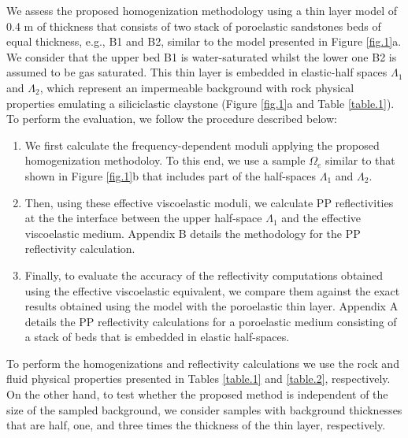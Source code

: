 \documentclass[draft]{agujournal2019}
\begin{document}
We assess the proposed homogenization methodology using a thin layer model of 0.4 m  of thickness that consists of two stack of poroelastic  sandstones beds of equal thickness, e.g., B1 and B2, similar to the model presented in Figure \ref{fig.1}a. We consider that the upper bed B1 is water-saturated whilst the lower one B2 is assumed to be gas saturated. This thin layer is embedded 
in elastic-half spaces $\Lambda_1$ and $\Lambda_2$, which represent an impermeable background  with rock physical properties emulating a siliciclastic claystone (Figure \ref{fig.1}a and Table \ref{table.1}). To perform the evaluation, we follow the procedure described below: 
\begin{enumerate}
    \item We first calculate the frequency-dependent moduli applying the proposed homogenization methodoloy. To this end, we use a sample $\Omega_e$ similar to that shown in Figure \ref{fig.1}b that includes part of the half-spaces $\Lambda_1$ and $\Lambda_2$. 
    
    \item Then, using these effective viscoelastic moduli, we calculate PP reflectivities  at the the interface between the upper half-space $\Lambda_1$ and the effective viscoelastic medium. Appendix B details the methodology for the PP reflectivity calculation.
    
    \item  Finally, to evaluate the accuracy of the reflectivity computations obtained using the effective viscoelastic equivalent, we compare them against the exact results obtained using the model with the poroelastic thin layer. Appendix A details the PP reflectivity calculations for a poroelastic medium consisting of a stack of beds that is embedded in elastic half-spaces.
\end{enumerate}

To perform the homogenizations and reflectivity calculations we use the rock and fluid physical properties presented in Tables \ref{table.1} and \ref{table.2}, respectively. On the other hand,  to test whether the proposed method is independent of the size of the sampled background, we consider samples with background thicknesses that are half, one, and three times the thickness of the thin layer, respectively.
\end{document}
